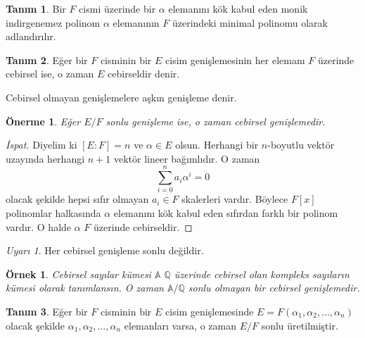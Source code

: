 \documentclass[draft]{article}
\newtheorem{prop}[thm]{Önerme}
\newtheorem{exmp}{Örnek}
\theoremstyle{definition}
\newtheorem{defn}{Tanım}[section]
\theoremstyle{remark}
\newtheorem{rem}{Uyarı}[section]
\begin{document}
            \begin{defn}
                Bir $F$ cismi üzerinde bir $\alpha$ elemanını kök kabul eden monik indirgenemez polinom $\alpha$ elemanının $F$ üzerindeki minimal polinomu olarak adlandırılır.
            \end{defn}
            
            \begin{defn}
                Eğer bir $F$ cisminin bir $E$ cisim genişlemesinin her elemanı $F$ üzerinde cebirsel ise, o zaman $E$ cebirseldir denir.\par
                Cebirsel olmayan genişlemelere aşkın genişleme denir.
            \end{defn}
            
            \begin{prop}
                Eğer $E/F$ sonlu genişleme ise, o zaman cebirsel genişlemedir.
            \end{prop}
            
            \begin{proof}[İspat]
                Diyelim ki $[E:F] = n$ ve $\alpha \in E$ olsun. Herhangi bir $n$-boyutlu vektör uzayında herhangi $n + 1$ vektör lineer bağımlıdır.
                O zaman
                \begin{equation*}
                    \displaystyle\sum_{i = 0}^{n}{a_i\alpha^i} = 0
                \end{equation*}
                olacak şekilde hepsi sıfır olmayan $a_i \in F$ skalerleri vardır. Böylece $F[x]$ polinomlar halkasında $\alpha$ elemanını kök kabul eden sıfırdan farklı bir polinom vardır. O halde $\alpha$ $F$ üzerinde cebirseldir.
            \end{proof}
            
            \begin{rem}
                Her cebirsel genişleme sonlu değildir.
            \end{rem}
            
            \begin{exmp}
                Cebirsel sayılar kümesi $\mathbb{A}$ $\mathbb{Q}$ üzerinde cebirsel olan kompleks sayıların kümesi olarak tanımlansın. O zaman $\mathbb{A}/\mathbb{Q}$ sonlu olmayan bir cebirsel genişlemedir.
                
            \end{exmp}
            
            \begin{defn}
                Eğer bir $F$ cisminin bir $E$ cisim genişlemesinde $E = F(\alpha_1, \alpha_2, \dots, \alpha_n)$ olacak şekilde $\alpha_1, \alpha_2, \dots, \alpha_n$ elemanları varsa, o zaman $E/F$ sonlu üretilmiştir.
            \end{defn}
            
\end{document}
